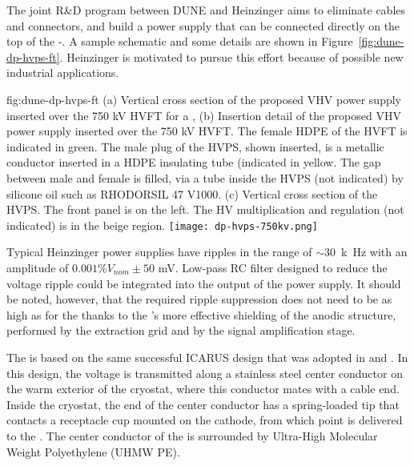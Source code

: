 The joint R\&D program between DUNE and Heinzinger aims to eliminate cables and connectors, and build a power supply that can be connected directly on the top of the \hv{}-\fdth.  A sample schematic and some details are shown in Figure~\ref{fig:dune-dp-hvps-ft}. 
Heinzinger is motivated to pursue this effort because of possible new industrial applications.

\begin{dunefigure}
{fig:dune-dp-hvps-ft}
{(a) Vertical cross section of the proposed VHV power supply inserted over the 750 kV HVFT for a \dpmod{}, 
(b) Insertion detail of the proposed VHV power supply inserted over the 750 kV HVFT. The female HDPE of the HVFT is indicated in green. The male plug of the HVPS, shown inserted, is a metallic conductor inserted in a HDPE insulating tube (indicated in yellow. The gap between male and female is filled, via a tube inside the HVPS (not indicated) by silicone oil such as RHODORSIL 47 V1000. (c) Vertical cross section of the HVPS. The front panel is on the left. The HV multiplication and regulation (not indicated) is in the beige region.}
\texttt{[image: dp-hvps-750kv.png]}
\end{dunefigure}


Typical Heinzinger power supplies have ripples in the range of $\sim$\SI{30}{k\hertz} with an amplitude of $0.001\%V_{nom} \pm 50$ mV. Low-pass RC filter designed to reduce the voltage ripple could be integrated into the output of the power supply.  It should be noted, however, that the required ripple suppression does not need to be as high as for the  thanks to the 's more effective shielding of the anodic structure, performed by the extraction grid and by the  signal amplification stage. 


The \hv \fdth is based on the same successful ICARUS design that was adopted in  and .  In this design, the voltage is transmitted along a stainless steel center conductor on the warm exterior of the cryostat, where this conductor mates with a cable end.  Inside the cryostat, the end of the center conductor has a spring-loaded tip that  contacts a receptacle cup mounted on the cathode, from which point \hv is delivered to the \fc.  The center conductor of the \fdth is surrounded by Ultra-High Molecular Weight Polyethylene (UHMW PE).  


